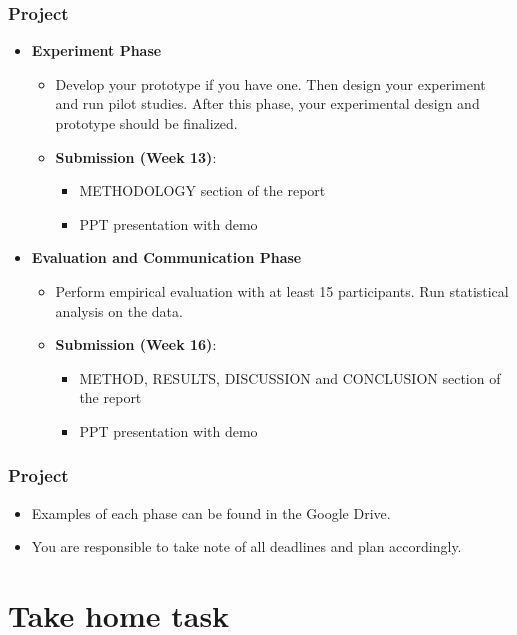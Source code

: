 \documentclass{beamer}
\begin{document}
\begin{frame}
\frametitle{Project}
\begin{itemize}
	\item \textbf{Experiment Phase}
	\begin{itemize}
		\item Develop your prototype if you have one.   Then design your experiment and run pilot studies.  After this phase, your experimental design and prototype should be finalized.
		\item \textbf{Submission (Week 13)}:
		\begin{itemize}
			\item METHODOLOGY section of the report
			\item PPT presentation with demo
		\end{itemize}
	\end{itemize}
	\item \textbf{Evaluation and Communication Phase}
	\begin{itemize}
		\item Perform empirical evaluation with at least 15 participants.  Run statistical analysis on the data.  
		\item \textbf{Submission (Week 16)}:
		\begin{itemize}
			\item  METHOD, RESULTS, DISCUSSION and CONCLUSION section of the report
			\item  PPT presentation with demo
		\end{itemize}
	\end{itemize}
\end{itemize}
\end{frame}

\begin{frame}
\frametitle{Project}
\begin{itemize}
	\item Examples of each phase can be found in the Google Drive.
	\item You are responsible to take note of all deadlines and plan accordingly.
\end{itemize}
\end{frame}

\section{Take home task}
\end{document}
